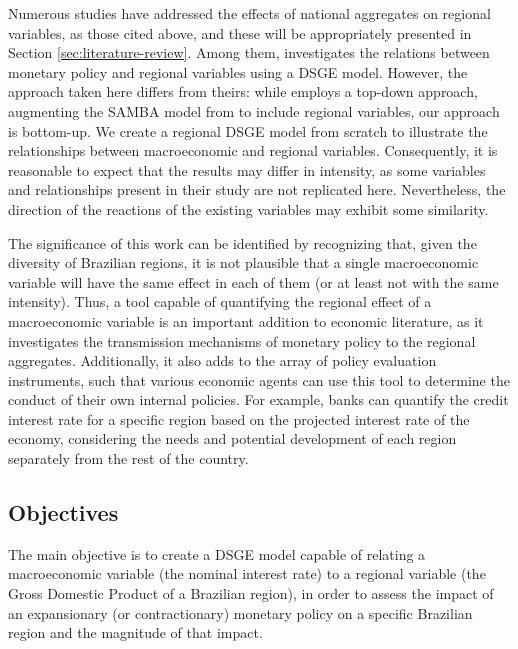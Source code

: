 \documentclass[../thesis.tex]{subfiles}
\begin{document}

Numerous studies have addressed the effects of national aggregates on regional variables, as those cited above, and these will be appropriately presented in Section \eqref{sec:literature-review}. Among them, \textcite{osterno_uma_2022} investigates the relations between monetary policy and regional variables using a DSGE model. However, the approach taken here differs from theirs: while \textcite{osterno_uma_2022} employs a top-down approach, augmenting the SAMBA model from \textcite{castro_samba_2015} to include regional variables, our approach is bottom-up. We create a regional DSGE model from scratch to illustrate the relationships between macroeconomic and regional variables. Consequently, it is reasonable to expect that the results may differ in intensity, as some variables and relationships present in their study are not replicated here. Nevertheless, the direction of the reactions of the existing variables may exhibit some similarity.

The significance of this work can be identified by recognizing that, given the diversity of Brazilian regions, it is not plausible that a single macroeconomic variable will have the same effect in each of them (or at least not with the same intensity). Thus, a tool capable of quantifying the regional effect of a macroeconomic variable is an important addition to economic literature, as it investigates the transmission mechanisms of monetary policy to the regional aggregates. Additionally, it also adds to the array of policy evaluation instruments, such that various economic agents can use this tool to determine the conduct of their own internal policies. For example, banks can quantify the credit interest rate for a specific region based on the projected interest rate of the economy, considering the needs and potential development of each region separately from the rest of the country.

\subsection*{Objectives}

The main objective is to create a DSGE model capable of relating a macroeconomic variable (the nominal interest rate) to a regional variable (the Gross Domestic Product of a Brazilian region), in order to assess the impact of an expansionary (or contractionary) monetary policy on a specific Brazilian region and the magnitude of that impact.
\end{document}
